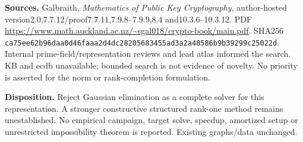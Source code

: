 \documentclass[11pt]{article}
\begin{document}
\textbf{Sources.} Galbraith, \emph{Mathematics of Public Key Cryptography},
author-hosted version2.0,7.7.12/proof7.7.11,7.9.8--7.9.9,8.4 and10.3.6--10.3.12.
PDF \url{https://www.math.auckland.ac.nz/~sgal018/crypto-book/main.pdf}.
SHA256 \nolinkurl{ca75ee62b96daa0d46faaa2d4dc28205683455ad3a2a48586b9b39299c25022d}.
Internal prime-field/representation reviews and lead atlas informed the search.
KB and ecdb unavailable; bounded search is not evidence of novelty. No priority
is asserted for the norm or rank-completion formulation.

\textbf{Disposition.} Reject Gaussian elimination as a complete solver for
this representation. A stronger constructive structured rank-one method remains
unestablished. No empirical campaign, target solve, speedup, amortized setup or
unrestricted impossibility theorem is reported. Existing graphs/data unchanged.
\end{document}
